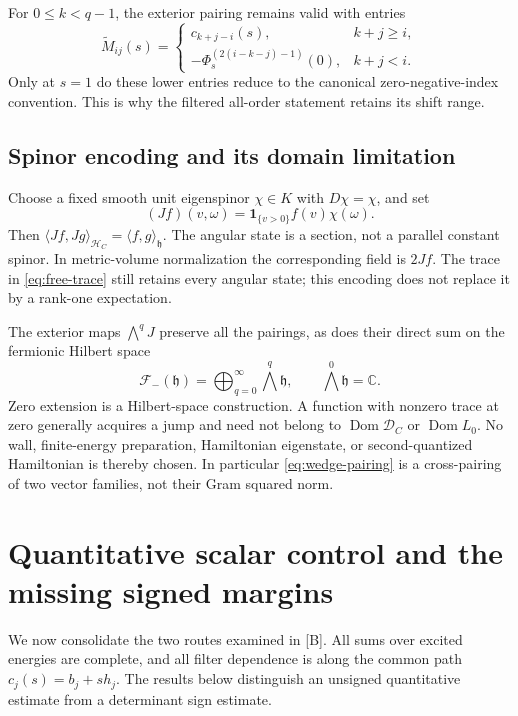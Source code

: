 \documentclass[11pt,letterpaper]{article}
\numberwithin{equation}{section}
\theoremstyle{remark}
\DeclareMathOperator{\Dom}{Dom}
\newcommand{\C}{\mathbb C}
\newcommand{\ip}[2]{\langle #1,#2\rangle}
\newcommand{\evid}[1]{\textsf{[#1]}}
\newcommand{\hc}{\mathcal H_C}
\newcommand{\hs}{\mathfrak h}
\newcommand{\dc}{\mathcal D_C}
\begin{document}
For \(0\le k<q-1\), the exterior pairing remains valid with entries
\begin{equation}
 \widetilde M_{ij}(s)=
 \begin{cases}
 c_{k+j-i}(s),&k+j\ge i,\\
 -\Phi_s^{(2(i-k-j)-1)}(0),&k+j<i.
 \end{cases}
 \label{eq:lower-block}
\end{equation}
Only at \(s=1\) do these lower entries reduce to the canonical
zero-negative-index convention. This is why the filtered
all-order statement retains its shift range.

\subsection{Spinor encoding and its domain limitation}

Choose a fixed smooth unit eigenspinor \(\chi\in K\) with
\(D\chi=\chi\), and set
\begin{equation}
 (Jf)(v,\omega)=\mathbf1_{\{v>0\}}f(v)\chi(\omega).
 \label{eq:embedding}
\end{equation}
Then \(\ip{Jf}{Jg}_{\hc}=\ip{f}{g}_{\hs}\).
The angular state is a section, not a parallel constant spinor.
In metric-volume normalization the corresponding field is \(2Jf\).
The trace in \eqref{eq:free-trace} still retains every angular
state; this encoding does not replace it by a rank-one expectation.

The exterior maps \(\bigwedge^qJ\) preserve all the pairings, as does
their direct sum on the fermionic Hilbert space
\[
 \mathcal F_-(\hs)=\bigoplus_{q=0}^\infty\bigwedge^q\hs,
 \qquad \bigwedge^0\hs=\C.
\]
Zero extension is a Hilbert-space construction. A function with
nonzero trace at zero generally acquires a jump and need not belong
to \(\Dom\dc\) or \(\Dom L_0\). No wall, finite-energy preparation,
Hamiltonian eigenstate, or second-quantized Hamiltonian is thereby
chosen. In particular \eqref{eq:wedge-pairing} is a cross-pairing of
two vector families, not their Gram squared norm.

\section{Quantitative scalar control and the missing signed margins}
\label{sec:transfer}

We now consolidate the two routes examined in \evid{B}.
All sums over excited energies are complete, and all filter
dependence is along the common path \(c_j(s)=b_j+s h_j\).
The results below distinguish an unsigned quantitative estimate
from a determinant sign estimate.
\end{document}
